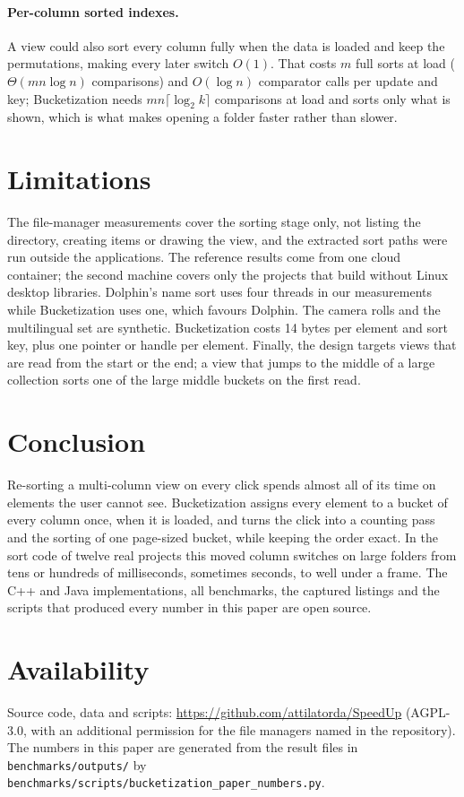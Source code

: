 \documentclass[11pt]{article}
\theoremstyle{definition}
\begin{document}
\paragraph{Per-column sorted indexes.} A view could also sort every column
fully when the data is loaded and keep the permutations, making every later
switch $O(1)$. That costs $m$ full sorts at load ($\Theta(mn\log n)$
comparisons) and $O(\log n)$ comparator calls per update and key; Bucketization
needs $mn\lceil\log_2 k\rceil$ comparisons at load and sorts only what is shown,
which is what makes opening a folder faster rather than slower.

\section{Limitations}\label{sec:limits}

The file-manager measurements cover the sorting stage only, not listing the
directory, creating items or drawing the view, and the extracted sort paths
were run outside the applications. The reference results come from one cloud
container; the second machine covers only the projects that build without Linux
desktop libraries. Dolphin's name sort uses four threads in our measurements
while Bucketization uses one, which favours Dolphin. The camera rolls and the
multilingual set are synthetic. Bucketization costs 14 bytes per element and
sort key, plus one pointer or handle per element. Finally, the design targets
views that are read from the start or the end; a view that jumps to the middle
of a large collection sorts one of the large middle buckets on the first read.

\section{Conclusion}

Re-sorting a multi-column view on every click spends almost all of its time on
elements the user cannot see. Bucketization assigns every element to a
bucket of every column once, when it is loaded, and turns the click into a
counting pass and the sorting of one page-sized bucket, while keeping the order
exact. In the sort code of twelve real projects this moved column switches on
large folders from tens or hundreds of milliseconds, sometimes seconds, to
well under a frame. The C++ and Java implementations, all benchmarks, the
captured listings and the scripts that produced every number in this paper are
open source.

\section*{Availability}

Source code, data and scripts: \url{https://github.com/attilatorda/SpeedUp}
(AGPL-3.0, with an additional permission for the file managers named in the
repository). The numbers in this paper are generated from the result files in
\nolinkurl{benchmarks/outputs/} by
\nolinkurl{benchmarks/scripts/bucketization_paper_numbers.py}.



\end{document}
